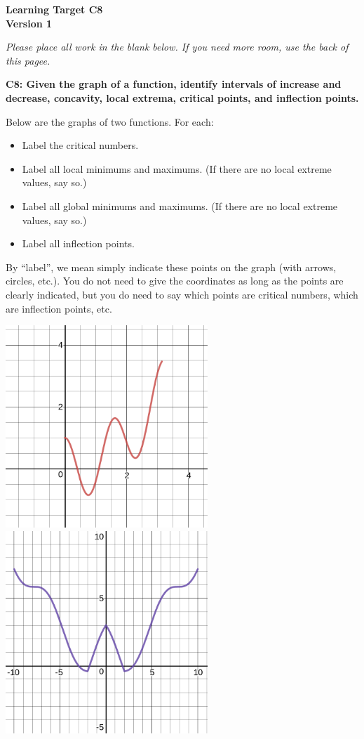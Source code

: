 \documentclass[10pt]{article}
\begin{document}
	\vspace*{0in}

		\begin{center}
			\textbf{Learning Target C8 \\
			Version 1}
		\end{center}

\emph{Please place all work in the blank below. If you need more room, use the back of this pagee.}

\begin{framed}
	\textbf{C8: Given the graph of a function, identify intervals of increase and decrease, concavity, local extrema, critical points, and inflection points. }
\end{framed}


Below are the graphs of two functions. For each: 
\begin{itemize}
    \item Label the critical numbers. 
    \item Label all local minimums and maximums. (If there are no local extreme values, say so.) 
    \item Label all global minimums and maximums. (If there are no local extreme values, say so.) 
    \item Label all inflection points. 
\end{itemize}
By ``label'', we mean simply indicate these points on the graph (with arrows, circles, etc.). You do not need to give the coordinates as long as the points are clearly indicated, but you do need to say which points are critical numbers, which are inflection points, etc. 

\begin{center}
    \includegraphics[width=3in]{ltc8-v1.png}
    \includegraphics[width=3in]{ltc8-v1-b.png}
\end{center}
\end{document}

